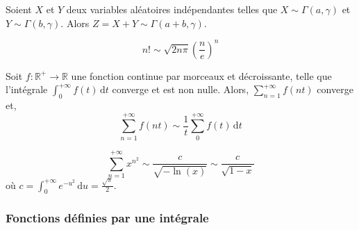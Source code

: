 	
	\begin{lemma}
		Soient $X$ et $Y$ deux variables aléatoires indépendantes telles que $X \sim \Gamma(a, \gamma)$ et $Y \sim \Gamma(b, \gamma)$. Alors $Z = X + Y \sim \Gamma(a+b, \gamma)$.
	\end{lemma}
	
	
	\begin{application}
		\[ n! \sim \sqrt{2n\pi} \left(\frac{n}{e} \right)^n \]
	\end{application}
	
	
	\begin{proposition}
		Soit $f : \mathbb{R}^+ \rightarrow \mathbb{R}$ une fonction continue par morceaux et décroissante, telle que l'intégrale $\int_0^{+\infty} f(t) \, \mathrm{d}t$ converge et est non nulle. Alors, $\sum_{n=1}^{+\infty} f(nt)$ converge et,
		\[ \sum_{n=1}^{+\infty} f(nt) \sim \frac{1}{t} \sum_0^{+\infty} f(t) \, \mathrm{d}t \]
	\end{proposition}
	
	\begin{example}
		\[ \sum_{n=1}^{+\infty} x^{n^2} \sim \frac{c}{\sqrt{-\ln(x)}} \sim \frac{c}{\sqrt{1-x}} \]
		où $c = \int_0^{+\infty} e^{-u^2} \, \mathrm{d}u = \frac{\sqrt{\pi}}{2}$.
	\end{example}
	
	\subsubsection{Fonctions définies par une intégrale}
	
	
